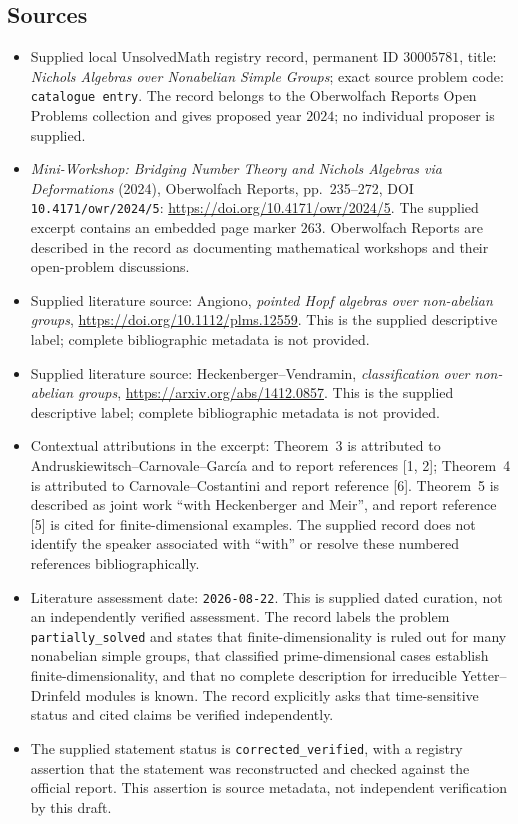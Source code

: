 \documentclass[11pt]{article}
\begin{document}
\subsection{Sources}
\begin{itemize}
\item Supplied local UnsolvedMath registry record, permanent ID \(30005781\), title: \emph{Nichols Algebras over Nonabelian Simple Groups}; exact source problem code: \texttt{catalogue entry}. The record belongs to the Oberwolfach Reports Open Problems collection and gives proposed year \(2024\); no individual proposer is supplied.
\item \emph{Mini-Workshop: Bridging Number Theory and Nichols Algebras via Deformations} (2024), Oberwolfach Reports, pp.~235--272, DOI \texttt{10.4171/owr/2024/5}: \url{https://doi.org/10.4171/owr/2024/5}. The supplied excerpt contains an embedded page marker \(263\). Oberwolfach Reports are described in the record as documenting mathematical workshops and their open-problem discussions.
\item Supplied literature source: Angiono, \emph{pointed Hopf algebras over non-abelian groups}, \url{https://doi.org/10.1112/plms.12559}. This is the supplied descriptive label; complete bibliographic metadata is not provided.
\item Supplied literature source: Heckenberger--Vendramin, \emph{classification over non-abelian groups}, \url{https://arxiv.org/abs/1412.0857}. This is the supplied descriptive label; complete bibliographic metadata is not provided.
\item Contextual attributions in the excerpt: Theorem~3 is attributed to Andruskiewitsch--Carnovale--Garc\'ia and to report references [1, 2]; Theorem~4 is attributed to Carnovale--Costantini and report reference [6]. Theorem~5 is described as joint work ``with Heckenberger and Meir'', and report reference [5] is cited for finite-dimensional examples. The supplied record does not identify the speaker associated with ``with'' or resolve these numbered references bibliographically.
\item Literature assessment date: \texttt{2026-08-22}. This is supplied dated curation, not an independently verified assessment. The record labels the problem \texttt{partially\_solved} and states that finite-dimensionality is ruled out for many nonabelian simple groups, that classified prime-dimensional cases establish finite-dimensionality, and that no complete description for irreducible Yetter--Drinfeld modules is known. The record explicitly asks that time-sensitive status and cited claims be verified independently.
\item The supplied statement status is \texttt{corrected\_verified}, with a registry assertion that the statement was reconstructed and checked against the official report. This assertion is source metadata, not independent verification by this draft.
\end{itemize}
\end{document}
